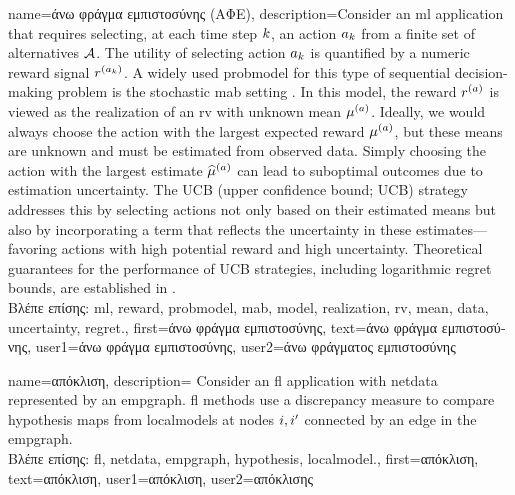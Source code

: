 {name={\foreignlanguage{greek}{άνω φράγμα εμπιστοσύνης (ΑΦΕ)}},
	description={Consider an \gls{ml} 
		application that requires selecting, at each time step $k$, an action $a_{k}$ 
		from a finite set of alternatives $\mathcal{A}$. The utility of selecting action $a_{k}$ 
		is quantified by a numeric \gls{reward} signal $r^{(a_{k})}$. 
		A widely used \gls{probmodel} for this type of sequential decision-making problem 
		is the stochastic \gls{mab} setting \cite{Bubeck2012}. In this \gls{model}, 
		the \gls{reward} $r^{(a)}$ is viewed as the \gls{realization} of an \gls{rv} 
		with unknown \gls{mean} $\mu^{(a)}$. Ideally, we would always choose the 
		action with the largest expected \gls{reward} $\mu^{(a)}$, but these 
		\gls{mean}s are unknown and must be estimated from observed \gls{data}. Simply 
		choosing the action with the largest estimate $\widehat{\mu}^{(a)}$ can 
		lead to suboptimal outcomes due to estimation \gls{uncertainty}. The UCB (upper confidence bound; UCB) strategy 
		addresses this by selecting actions not only based on their estimated \gls{mean}s but 
		also by incorporating a term that reflects the \gls{uncertainty} in these estimates—favoring 
		actions with high potential \gls{reward} and high \gls{uncertainty}. Theoretical guarantees 
		for the performance of UCB strategies, including logarithmic \gls{regret} bounds, are established in \cite{Bubeck2012}.\\
		\foreignlanguage{greek}{Βλέπε επίσης:} \gls{ml}, \gls{reward}, \gls{probmodel}, \gls{mab}, \gls{model}, \gls{realization}, \gls{rv}, \gls{mean}, \gls{data}, \gls{uncertainty}, \gls{regret}.},
	first={\foreignlanguage{greek}{άνω φράγμα εμπιστοσύνης}},
	text={\foreignlanguage{greek}{άνω φράγμα εμπιστοσύνης}},
	user1={\foreignlanguage{greek}{άνω φράγμα εμπιστοσύνης}}, %
    	user2={\foreignlanguage{greek}{άνω φράγματος εμπιστοσύνης}} %
}

{name={\foreignlanguage{greek}{απόκλιση}},
	description={
		Consider an \gls{fl} application with \gls{netdata} 
		represented by an \gls{empgraph}. \gls{fl} methods use a discrepancy measure 
		to compare \gls{hypothesis} maps from \gls{localmodel}s at nodes $i,i'$ 
		connected by an edge in the \gls{empgraph}.\\
		\foreignlanguage{greek}{Βλέπε επίσης:} \gls{fl}, \gls{netdata}, \gls{empgraph}, \gls{hypothesis}, \gls{localmodel}.},
	first={\foreignlanguage{greek}{απόκλιση}},
	text={\foreignlanguage{greek}{απόκλιση}},
	user1={\foreignlanguage{greek}{απόκλιση}}, %
	user2={\foreignlanguage{greek}{απόκλισης}} %
}

